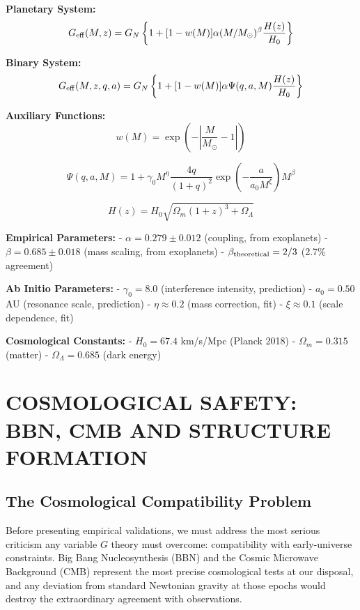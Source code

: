 \documentclass[11pt,a4paper]{article}
\begin{document}
\textbf{Planetary System:}
\[G_{\rm eff}(M,z) = G_N \left\{1 + [1-w(M)] \alpha (M/M_\odot)^\beta \frac{H(z)}{H_0}\right\}\]

\textbf{Binary System:}
\[G_{\rm eff}(M,z,q,a) = G_N \left\{1 + [1-w(M)] \alpha \Psi(q,a,M) \frac{H(z)}{H_0}\right\}\]

\textbf{Auxiliary Functions:}
\[w(M) = \exp\left(-\left|\frac{M}{M_\odot}-1\right|\right)\]

\[\Psi(q,a,M) = 1 + \gamma_0 M^\eta \frac{4q}{(1+q)^2} \exp\left(-\frac{a}{a_0 M^\xi}\right) M^\beta\]

\[H(z) = H_0 \sqrt{\Omega_m(1+z)^3 + \Omega_\Lambda}\]

\textbf{Empirical Parameters:} - \(\alpha = 0.279 \pm 0.012\) (coupling,
from exoplanets) - \(\beta = 0.685 \pm 0.018\) (mass scaling, from
exoplanets) - \(\beta_{\rm theoretical} = 2/3\) (2.7\% agreement)

\textbf{Ab Initio Parameters:} - \(\gamma_0 = 8.0\) (interference
intensity, prediction) - \(a_0 = 0.50\) AU (resonance scale, prediction)
- \(\eta \approx 0.2\) (mass correction, fit) - \(\xi \approx 0.1\)
(scale dependence, fit)

\textbf{Cosmological Constants:} - \(H_0 = 67.4\) km/s/Mpc (Planck 2018)
- \(\Omega_m = 0.315\) (matter) - \(\Omega_\Lambda = 0.685\) (dark
energy)

\hypertarget{cosmological-safety-bbn-cmb-and-structure-formation}{%
\section{COSMOLOGICAL SAFETY: BBN, CMB AND STRUCTURE
FORMATION}\label{cosmological-safety-bbn-cmb-and-structure-formation}}

\hypertarget{the-cosmological-compatibility-problem}{%
\subsection{The Cosmological Compatibility
Problem}\label{the-cosmological-compatibility-problem}}

Before presenting empirical validations, we must address the most
serious criticism any variable \(G\) theory must overcome: compatibility
with early-universe constraints. Big Bang Nucleosynthesis (BBN) and the
Cosmic Microwave Background (CMB) represent the most precise
cosmological tests at our disposal, and any deviation from standard
Newtonian gravity at those epochs would destroy the extraordinary
agreement with observations.
\end{document}
